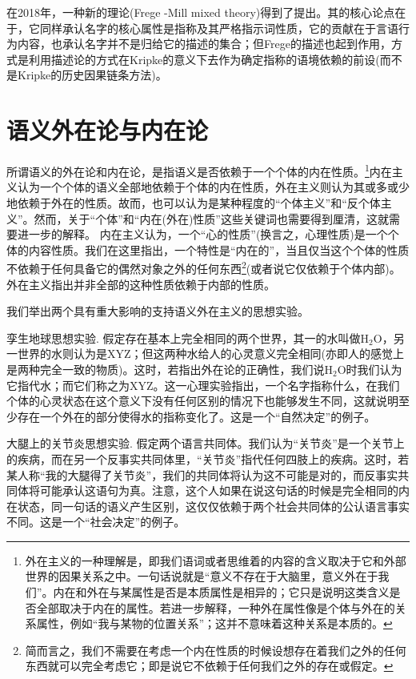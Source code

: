 \documentclass{article}
\begin{document}
在2018年，一种新的理论(Frege
-Mill mixed theory)得到了提出。其的核心论点在于，它同样承认名字的核心属性是指称及其严格指示词性质，它的贡献在于言语行为内容，也承认名字并不是归给它的描述的集合；但Frege的描述也起到作用，方式是利用描述论的方式在Kripke的意义下去作为确定指称的语境依赖的前设(而不是Kripke的历史因果链条方法)。

\section{语义外在论与内在论}
所谓语义的外在论和内在论，是指语义是否依赖于一个个体的内在性质。\footnote{外在主义的一种理解是，即我们语词或者思维着的内容的含义取决于它和外部世界的因果关系之中。一句话说就是“意义不存在于大脑里，意义外在于我们”。内在和外在与某属性是否是本质属性是相异的；它只是说明这类含义是否全部取决于内在的属性。若进一步解释，一种外在属性像是个体与外在的关系属性，例如“我与某物的位置关系”；这并不意味着这种关系是本质的。}内在主义认为一个个体的语义全部地依赖于个体的内在性质，外在主义则认为其或多或少地依赖于外在的性质。故而，也可以认为是某种程度的“个体主义”和“反个体主义”。然而，关于“个体”和“内在(外在)性质”这些关键词也需要得到厘清，这就需要进一步的解释。
内在主义认为，一个“心的性质”(换言之，心理性质)是一个个体的内容性质。我们在这里指出，一个特性是“内在的”，当且仅当这个个体的性质不依赖于任何具备它的偶然对象之外的任何东西\footnote{简而言之，我们不需要在考虑一个内在性质的时候设想存在着我们之外的任何东西就可以完全考虑它；即是说它不依赖于任何我们之外的存在或假定。}(或者说它仅依赖于个体内部)。外在主义指出并非全部的这种性质依赖于内部的性质。

我们举出两个具有重大影响的支持语义外在主义的思想实验。

{\kaishu 孪生地球思想实验.}
假定存在基本上完全相同的两个世界，其一的水叫做$\mathrm{H_2O}$，另一世界的水则认为是XYZ；但这两种水给人的心灵意义完全相同(亦即人的感觉上是两种完全一致的物质)。这时，若指出外在论的正确性，我们说$\mathrm{H_2O}$时我们认为它指代水；而它们称之为XYZ。这一心理实验指出，一个名字指称什么，在我们个体的心灵状态在这个意义下没有任何区别的情况下也能够发生不同，这就说明至少存在一个外在的部分使得水的指称变化了。这是一个“自然决定”的例子。

{\kaishu 大腿上的关节炎思想实验.}
假定两个语言共同体。我们认为“关节炎”是一个关节上的疾病，而在另一个反事实共同体里，“关节炎”指代任何四肢上的疾病。这时，若某人称“我的大腿得了关节炎”，我们的共同体将认为这不可能是对的，而反事实共同体将可能承认这语句为真。注意，这个人如果在说这句话的时候是完全相同的内在状态，同一句话的语义产生区别，这仅仅依赖于两个社会共同体的公认语言事实不同。这是一个“社会决定”的例子。
\end{document}
